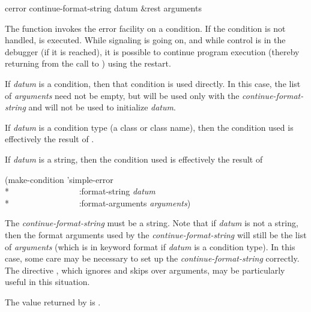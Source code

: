 \begin{defun}[Function]
cerror continue-format-string datum &rest arguments

The function 
invokes the error facility on a condition. If the condition is not handled,
 is executed. While signaling is going on,
and
while control is in the debugger (if it is reached), it is possible to continue
program execution (thereby returning from the call to )
using the  restart.

If \emph{datum} is a condition, then that condition is used directly. 
In this case, the list of \emph{arguments} need not be empty,
but will be used only with the \emph{continue-format-string}
and will not be used to initialize \emph{datum}.

If \emph{datum} is a condition type (a class or class name), then the condition
used is effectively the result of .

If \emph{datum} is a string, then the condition used is effectively the result of
\begin{lisp}
(make-condition 'simple-error \\*
~~~~~~~~~~~~~~~~:format-string \emph{datum} \\*
~~~~~~~~~~~~~~~~:format-arguments \emph{arguments})
\end{lisp}

The \emph{continue-format-string} must be a string.
Note that if \emph{datum} is not a 
string, then the format arguments used by the \emph{continue-format-string} will
still be the list of \emph{arguments} (which is in keyword format if \emph{datum} is a condition
type). In this case, some care may be necessary to set up the
\emph{continue-format-string} correctly. The  directive \cd{{\Xtilde}*},
which ignores and skips over  arguments,
may be particularly 
useful in this situation.

The value returned by  is .
\end{defun}

